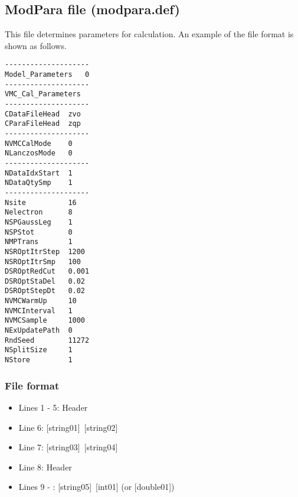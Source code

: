 \subsection{ModPara file (modpara.def)}
\label{Subsec:modpara}
This file determines parameters for calculation. An example of the file format is shown as follows.\\
\begin{minipage}{10cm}
\begin{screen}
\begin{verbatim}
--------------------
Model_Parameters   0
--------------------
VMC_Cal_Parameters
--------------------
CDataFileHead  zvo
CParaFileHead  zqp
--------------------
NVMCCalMode    0
NLanczosMode   0
--------------------
NDataIdxStart  1
NDataQtySmp    1
--------------------
Nsite          16
Nelectron      8
NSPGaussLeg    1
NSPStot        0
NMPTrans       1
NSROptItrStep  1200
NSROptItrSmp   100
DSROptRedCut   0.001
DSROptStaDel   0.02
DSROptStepDt   0.02
NVMCWarmUp     10
NVMCInterval   1
NVMCSample     1000
NExUpdatePath  0
RndSeed        11272
NSplitSize     1
NStore         1  
\end{verbatim}
\end{screen}
\end{minipage}

\subsubsection{File format}
 \begin{itemize}
   \item  Lines 1 - 5:  Header
   \item  Line 6:  [string01]~[string02]
   \item  Line 7:  [string03]~[string04]
   \item  Line 8:  Header
   \item  Lines 9 - : [string05]~[int01] (or [double01])
  \end{itemize}

